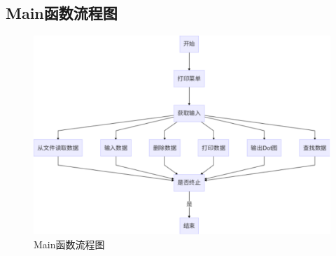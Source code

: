 \subsection{Main函数流程图}

\begin{figure}[H]
    \centering
    \includegraphics[width=0.7\linewidth]{figures/flowchart}
    \caption{Main函数流程图}
    \label{fig:flowchart}
\end{figure}

